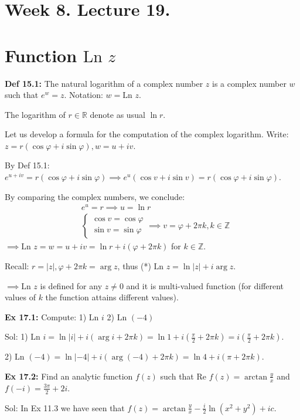 \documentclass{article}
\begin{document}
\section*{Week 8. Lecture 19.}

\section{Function $\text{Ln } z$}
\textbf{Def 15.1:} The natural logarithm of a complex number $z$ is a complex number $w$ such that $e^w = z$. Notation: $w = \text{Ln } z$.

The logarithm of $r \in \mathbb{R}$ denote as usual $\ln r$.

Let us develop a formula for the computation of the complex logarithm. Write: $z = r(\cos \varphi + i\sin \varphi), w = u + iv$.

By Def 15.1: $e^{u+iv} = r(\cos \varphi + i\sin \varphi) \implies e^u (\cos v + i\sin v) = r(\cos \varphi + i\sin \varphi)$.

By comparing the complex numbers, we conclude:
\begin{align*}
    &e^u = r \implies u = \ln r \\
    &\begin{cases}
    \cos v = \cos \varphi \\
    \sin v = \sin \varphi
    \end{cases} \implies v = \varphi + 2\pi k, k \in \mathbb{Z}
\end{align*}
$\implies \text{Ln } z = w = u + iv = \ln r + i(\varphi + 2\pi k)$ for $k \in \mathbb{Z}$.

Recall: $r = |z|, \varphi + 2\pi k = \arg z$, thus (*) $\text{Ln } z = \ln |z| + i \arg z$.

$\implies \text{Ln } z$ is defined for any $z \neq 0$ and it is multi-valued function (for different values of $k$ the function attains different values).

\textbf{Ex 17.1:} Compute: 1) $\text{Ln } i$ 2) $\text{Ln } (-4)$

Sol: 1) $\text{Ln } i = \ln |i| + i(\arg i + 2\pi k) = \ln 1 + i(\frac{\pi}{2} + 2\pi k) = i(\frac{\pi}{2} + 2\pi k)$.

2) $\text{Ln } (-4) = \ln |-4| + i(\arg(-4) + 2\pi k) = \ln 4 + i(\pi + 2\pi k)$.

\textbf{Ex 17.2:} Find an analytic function $f(z)$ such that $\text{Re } f(z) = \arctan \frac{y}{x}$ and $f(-i) = \frac{3\pi}{2} + 2i$.

Sol: In Ex 11.3 we have seen that $f(z) = \arctan \frac{y}{x} - \frac{i}{2} \ln(x^2 + y^2) + ic$.
\end{document}
